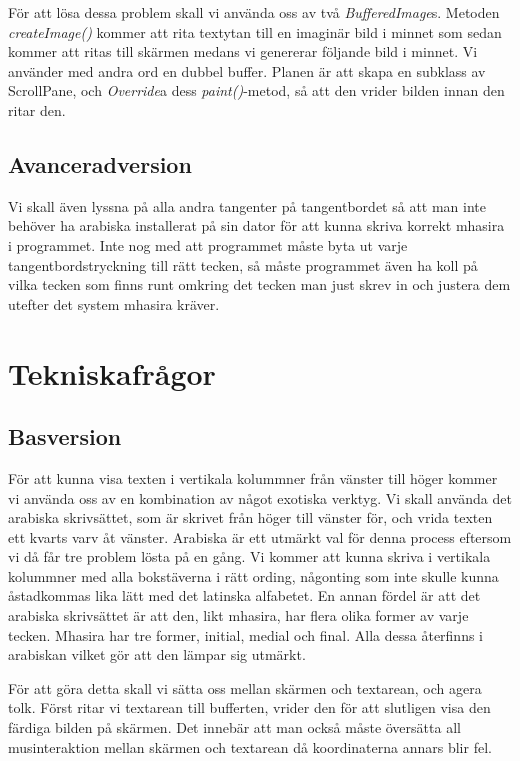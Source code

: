 \documentclass[a4paper,11p,twoside]{report}
\begin{document}
För att lösa dessa problem skall vi använda oss av två \emph{BufferedImage}s. Metoden \emph{createImage()} kommer att rita textytan till en imaginär bild i minnet som sedan kommer att ritas till skärmen medans vi genererar följande bild i minnet. Vi använder med andra ord en  dubbel buffer. Planen är att skapa en subklass av ScrollPane, och \emph{Override}a dess \emph{paint()}-metod, så att den vrider bilden innan den ritar den. 

\subsection{Avanceradversion}
Vi skall även lyssna på alla andra tangenter på tangentbordet så att man inte behöver ha arabiska installerat på sin dator för att kunna skriva korrekt mhasira i programmet. Inte nog med att programmet måste byta ut varje tangentbordstryckning till rätt tecken, så måste programmet även ha koll på vilka tecken som finns runt omkring det tecken man just skrev in och justera dem utefter det system mhasira kräver.

\section{Tekniskafrågor}
\subsection{Basversion}
För att kunna visa texten i vertikala kolummner från vänster till höger kommer vi använda oss av en kombination av något exotiska verktyg. Vi skall använda det arabiska skrivsättet, som är skrivet från höger till vänster för, och vrida texten ett kvarts varv åt vänster. Arabiska är ett utmärkt val för denna process eftersom vi då får tre problem lösta på en gång. Vi kommer att kunna skriva i vertikala kolummner med alla bokstäverna i rätt ording, någonting som inte skulle kunna åstadkommas lika lätt med det latinska alfabetet. En annan fördel är att det arabiska skrivsättet är att den, likt mhasira, har flera olika former av varje tecken. Mhasira har tre former, initial, medial och final. Alla dessa återfinns i arabiskan vilket gör att den lämpar sig utmärkt.

För att göra detta skall vi sätta oss mellan skärmen och textarean, och agera tolk. Först ritar vi textarean till bufferten, vrider den för att slutligen visa den färdiga bilden på skärmen. Det innebär att man också måste översätta all musinteraktion mellan skärmen och textarean då koordinaterna annars blir fel.
\end{document}
